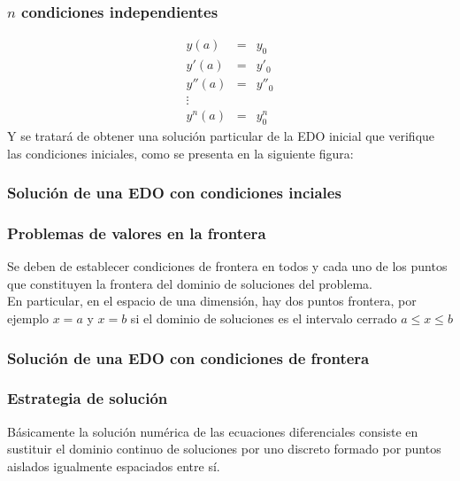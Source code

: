 \begin{frame}
\frametitle{$n$ condiciones independientes}
\begin{eqnarray*}
	y(a) & = & y_{0} \\
	y'(a) & = & y'_{0} \\
	y''(a) & = & y''_{0} \\
	\vdots \\
	y^{n}(a) & = & y^{n}_{0}
\end{eqnarray*}
Y se tratará de obtener una solución particular de la EDO inicial que verifique las condiciones iniciales, como se presenta en la siguiente figura:
\end{frame}
\begin{frame}[fragile]
\frametitle{Solución de una EDO con condiciones inciales}
\end{frame}
\begin{frame}
\frametitle{Problemas de valores en la frontera}
Se deben de establecer condiciones de frontera en todos y cada uno de los puntos que constituyen la frontera del dominio de soluciones del problema.
\\
\medskip
En particular, en el espacio de una dimensión, hay dos puntos frontera, por ejemplo $x=a$ y $x=b$ si el dominio de soluciones es el intervalo cerrado $a \leq x \leq b$
\end{frame}
\begin{frame}[fragile]
\frametitle{Solución de una EDO con condiciones de frontera}
\end{frame}
\begin{frame}
\frametitle{Estrategia de solución}
Básicamente la solución numérica de las ecuaciones diferenciales consiste en sustituir el dominio continuo de soluciones por uno discreto formado por puntos aislados igualmente espaciados entre sí.
\end{frame}
